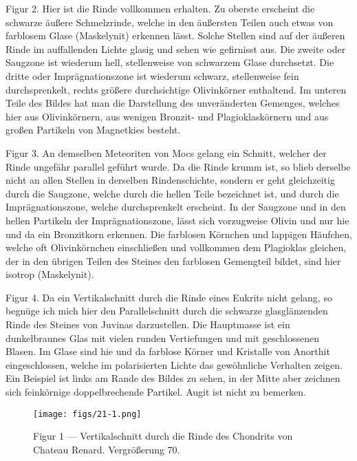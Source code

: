 \documentclass[a4paper, 12pt, oneside]{article}
\begin{document}
Figur 2. Hier ist die Rinde vollkommen erhalten. Zu oberste erscheint die schwarze äußere Schmelzrinde, welche in den äußersten Teilen auch etwas von farblosem Glase (Maskelynit) erkennen lässt. Solche Stellen sind auf der äußeren Rinde im auffallenden Lichte glasig und sehen wie gefirnisst aus. Die zweite oder Saugzone ist wiederum hell, stellenweise von schwarzem Glase durchsetzt. Die dritte oder Imprägnationszone ist wiederum schwarz, stellenweise fein durchsprenkelt, rechts größere durchsichtige Olivinkörner enthaltend. Im unteren Teile des Bildes hat man die Darstellung des unveränderten Gemenges, welches hier aus Olivinkörnern, aus wenigen Bronzit- und Plagioklaskörnern und aus großen Partikeln von Magnetkies besteht.

Figur 3. An demselben Meteoriten von Mocs gelang ein Schnitt, welcher der Rinde ungefähr parallel geführt wurde. Da die Rinde krumm ist, so blieb derselbe nicht an allen Stellen in derselben Rindenschichte, sondern er geht gleichzeitig durch die Saugzone, welche durch die hellen Teile bezeichnet ist, und durch die Imprägnationszone, welche durchsprenkelt erscheint. In der Saugzone und in den hellen Partikeln der Imprägnationszone, lässt sich vorzugweise Olivin und nur hie und da ein Bronzitkorn erkennen. Die farblosen Körnchen und lappigen Häufchen, welche oft Olivinkörnchen einschließen und vollkommen dem Plagioklas gleichen, der in den übrigen Teilen des Steines den farblosen Gemengteil bildet, sind hier isotrop (Maskelynit).

Figur 4. Da ein Vertikalschnitt durch die Rinde eines Eukrits nicht gelang, so begnüge ich mich hier den Parallelschnitt durch die schwarze glasglänzenden Rinde des Steines von Juvinas darzustellen. Die Hauptmasse ist ein dunkelbraunes Glas mit vielen runden Vertiefungen und mit geschlossenen Blasen. Im Glase sind hie und da farblose Körner und Kristalle von Anorthit eingeschlossen, welche im polarisierten Lichte das gewöhnliche Verhalten zeigen. Ein Beispiel ist links am Rande des Bildes zu sehen, in der Mitte aber zeichnen sich feinkörnige doppelbrechende Partikel. Augit ist nicht zu bemerken.
\clearpage

\vspace*{\fill}
\begin{figure}[H]
\centering
\texttt{[image: figs/21-1.png]}
\caption{\small Figur 1 --- Vertikalschnitt durch die Rinde des Chondrits von Chateau Renard. Vergrößerung 70.}
\end{figure}
\vspace*{\fill}
\clearpage
\end{document}
